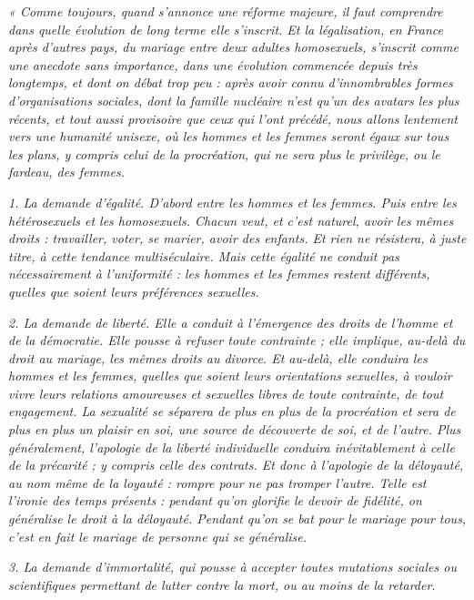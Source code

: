 \begin{displayquote}
\emph{« Comme toujours, quand s'annonce une réforme majeure, il faut comprendre dans quelle évolution de long terme elle s'inscrit.
Et la légalisation, en France après d'autres pays, du mariage entre deux adultes homosexuels, s'inscrit comme une anecdote sans importance, dans une évolution commencée depuis très longtemps, et dont on débat trop peu : après avoir connu d'innombrables formes d'organisations sociales, dont la famille nucléaire n'est qu'un des avatars les plus récents, et tout aussi provisoire que ceux qui l'ont précédé, nous allons lentement vers une humanité unisexe, où les hommes et les femmes seront égaux sur tous les plans, y compris celui de la procréation, qui ne sera plus le privilège, ou le fardeau, des femmes.}

\emph{1. La demande d'égalité. D'abord entre les hommes et les femmes. Puis entre les hétérosexuels et les homosexuels. Chacun veut, et c'est naturel, avoir les mêmes droits : travailler, voter, se marier, avoir des enfants. Et rien ne résistera, à juste titre, à cette tendance multiséculaire. Mais cette égalité ne conduit pas nécessairement à l'uniformité : les hommes et les femmes restent différents, quelles que soient leurs préférences sexuelles.}

 \emph{2. La demande de liberté. Elle a conduit à l'émergence des droits de l'homme et de la démocratie. Elle pousse à refuser toute contrainte ; elle implique, au-delà du droit au mariage, les mêmes droits au divorce. Et au-delà, elle conduira les hommes et les femmes, quelles que soient leurs orientations sexuelles, à vouloir vivre leurs relations amoureuses et sexuelles libres de toute contrainte, de tout engagement. La sexualité se séparera de plus en plus de la procréation et sera de plus en plus un plaisir en soi, une source de découverte de soi, et de l'autre. Plus généralement, l'apologie de la liberté individuelle conduira inévitablement à celle de la précarité ; y compris celle des contrats. Et donc à l'apologie de la déloyauté, au nom même de la loyauté : rompre pour ne pas tromper l'autre. Telle est l'ironie des temps présents : pendant qu'on glorifie le devoir de fidélité, on généralise le droit à la déloyauté. Pendant qu'on se bat pour le mariage pour tous, c'est en fait le mariage de personne qui se généralise.}
 
\emph{3. La demande d'immortalité, qui pousse à accepter toutes mutations sociales ou scientifiques permettant de lutter contre la mort, ou au moins de la retarder.}


\end{displayquote}
